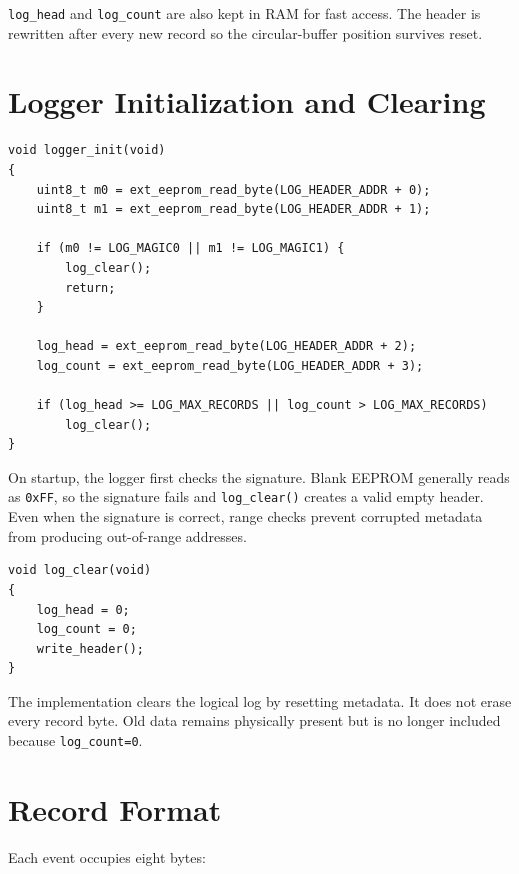 \documentclass[11pt,a4paper]{article}
\begin{document}
\texttt{log\_head} and \texttt{log\_count} are also kept in RAM for fast access. The header is rewritten after every new record so the circular-buffer position survives reset.

\section{Logger Initialization and Clearing}

\begin{lstlisting}[style=cstyle,caption={Persistent-header validation.}]
void logger_init(void)
{
    uint8_t m0 = ext_eeprom_read_byte(LOG_HEADER_ADDR + 0);
    uint8_t m1 = ext_eeprom_read_byte(LOG_HEADER_ADDR + 1);

    if (m0 != LOG_MAGIC0 || m1 != LOG_MAGIC1) {
        log_clear();
        return;
    }

    log_head = ext_eeprom_read_byte(LOG_HEADER_ADDR + 2);
    log_count = ext_eeprom_read_byte(LOG_HEADER_ADDR + 3);

    if (log_head >= LOG_MAX_RECORDS || log_count > LOG_MAX_RECORDS)
        log_clear();
}
\end{lstlisting}

On startup, the logger first checks the signature. Blank EEPROM generally reads as \texttt{0xFF}, so the signature fails and \texttt{log\_clear()} creates a valid empty header. Even when the signature is correct, range checks prevent corrupted metadata from producing out-of-range addresses.

\begin{lstlisting}[style=cstyle]
void log_clear(void)
{
    log_head = 0;
    log_count = 0;
    write_header();
}
\end{lstlisting}

The implementation clears the logical log by resetting metadata. It does not erase every record byte. Old data remains physically present but is no longer included because \texttt{log\_count=0}.

\section{Record Format}
Each event occupies eight bytes:
\end{document}
